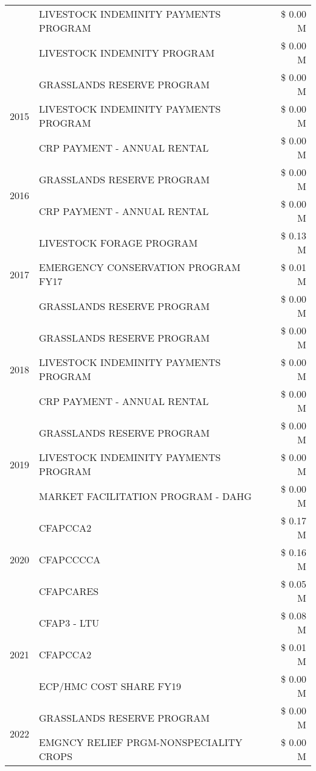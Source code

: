\begin{tabular}{llr}
 & LIVESTOCK INDEMINITY PAYMENTS PROGRAM & \$ 0.00 M \\
 & LIVESTOCK INDEMNITY PROGRAM & \$ 0.00 M \\
\cline{1-3}
\multirow[t]{3}{*}{2015} & GRASSLANDS RESERVE PROGRAM & \$ 0.00 M \\
 & LIVESTOCK INDEMINITY PAYMENTS PROGRAM & \$ 0.00 M \\
 & CRP PAYMENT - ANNUAL RENTAL & \$ 0.00 M \\
\cline{1-3}
\multirow[t]{2}{*}{2016} & GRASSLANDS RESERVE PROGRAM & \$ 0.00 M \\
 & CRP PAYMENT - ANNUAL RENTAL & \$ 0.00 M \\
\cline{1-3}
\multirow[t]{3}{*}{2017} & LIVESTOCK FORAGE PROGRAM & \$ 0.13 M \\
 & EMERGENCY CONSERVATION PROGRAM FY17 & \$ 0.01 M \\
 & GRASSLANDS RESERVE PROGRAM & \$ 0.00 M \\
\cline{1-3}
\multirow[t]{3}{*}{2018} & GRASSLANDS RESERVE PROGRAM & \$ 0.00 M \\
 & LIVESTOCK INDEMINITY PAYMENTS PROGRAM & \$ 0.00 M \\
 & CRP PAYMENT - ANNUAL RENTAL & \$ 0.00 M \\
\cline{1-3}
\multirow[t]{3}{*}{2019} & GRASSLANDS RESERVE PROGRAM & \$ 0.00 M \\
 & LIVESTOCK INDEMINITY PAYMENTS PROGRAM & \$ 0.00 M \\
 & MARKET FACILITATION PROGRAM - DAHG & \$ 0.00 M \\
\cline{1-3}
\multirow[t]{3}{*}{2020} & CFAPCCA2 & \$ 0.17 M \\
 & CFAPCCCCA & \$ 0.16 M \\
 & CFAPCARES & \$ 0.05 M \\
\cline{1-3}
\multirow[t]{3}{*}{2021} & CFAP3 - LTU & \$ 0.08 M \\
 & CFAPCCA2 & \$ 0.01 M \\
 & ECP/HMC COST SHARE FY19 & \$ 0.00 M \\
\cline{1-3}
\multirow[t]{2}{*}{2022} & GRASSLANDS RESERVE PROGRAM & \$ 0.00 M \\
 & EMGNCY RELIEF PRGM-NONSPECIALITY CROPS & \$ 0.00 M \\
\cline{1-3}
\bottomrule
\end{tabular}
